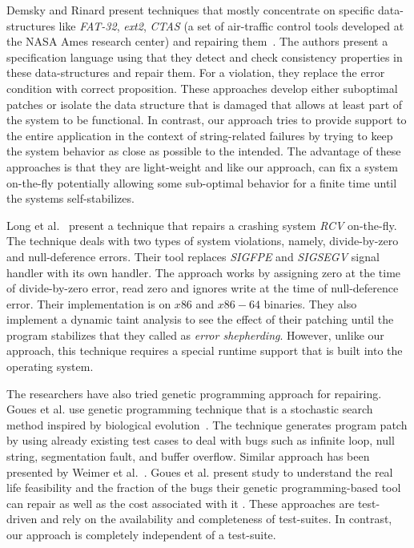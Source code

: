  Demsky and Rinard present techniques that
mostly concentrate on specific data-structures like \emph{FAT-32}, \emph{ext2},
\emph{CTAS} (a set of air-traffic control tools developed at the NASA Ames
research center) and repairing them~\cite{Demsky03automaticdata,
conf/issre/DemskyR03,conf/oopsla/DemskyR03, conf/issta/DemskyEGMPR06}. The
authors present a specification language using that they detect and check
consistency properties in these data-structures and repair them. For a
violation, they replace the error condition with correct proposition. These
approaches develop either suboptimal patches or isolate the data structure that
is damaged that allows at least part of the system to be functional. In
contrast, our approach tries to provide support to the entire application in the
context of string-related failures by trying to keep the system behavior as
close as possible to the intended. The advantage of these approaches is that
they are light-weight and like our approach, can fix a system on-the-fly
potentially allowing some sub-optimal behavior for a finite time until the
systems self-stabilizes.

Long et al.~\cite{conf/pldi/LongSR14} present a technique that repairs a
crashing system \emph{RCV} on-the-fly. The technique deals with two types of
system violations, namely, divide-by-zero and null-deference errors. Their tool
replaces \emph{SIGFPE} and \emph{SIGSEGV} signal handler with its own handler.
The approach works by assigning zero at the time of divide-by-zero error, read
zero and ignores write at the time of null-deference error. Their implementation
is on $x86$ and $x86-64$ binaries. They also implement a dynamic taint analysis
to see the effect of their patching until the program stabilizes that they
called as \emph{error shepherding}. However, unlike our approach, this technique
requires a special runtime support that is built into the operating system.

 The researchers have also tried genetic
programming approach for repairing. Goues et al. use genetic programming
technique that is a stochastic search method inspired by biological
evolution~\cite{GouesNFW12}. The technique generates program patch by using
already existing test cases to deal with bugs such as infinite loop, null
string, segmentation fault, and buffer overflow. Similar approach has been
presented by Weimer et al.~\cite{WeimerFGN10}. Goues et al. present study to
understand the real life feasibility and the fraction of the bugs their genetic
programming-based tool can repair as well as the cost associated with it
\cite{GouesDFW12}. These approaches are test-driven and rely on the availability
and completeness of test-suites. In contrast, our approach is completely
independent of a test-suite.


